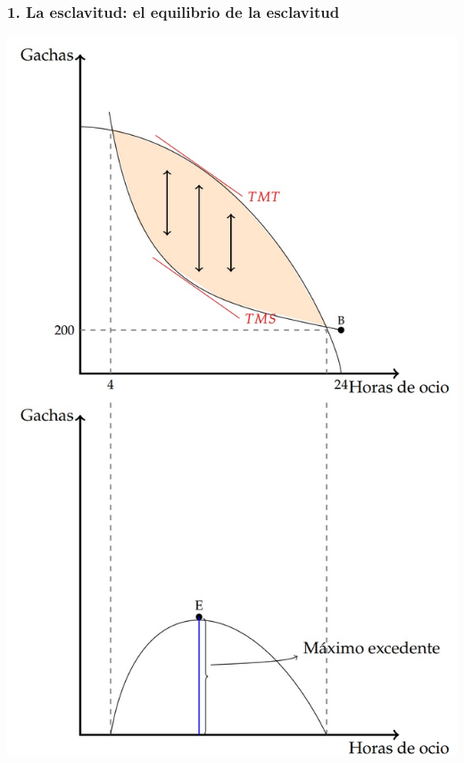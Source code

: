 \documentclass{beamer}
\begin{document}
\begin{frame}
\frametitle{1. La esclavitud: el equilibrio de la esclavitud}
\centering
\centering
\includegraphics[scale=0.55]{../Figures/C19.10.jpg}
\end{frame}
\end{document}
